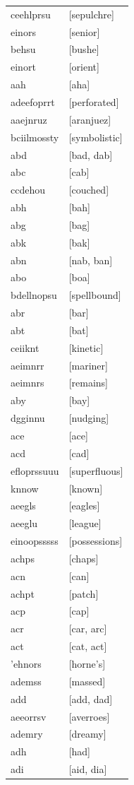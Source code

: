 \documentclass{article}
\begin{document}
\begin{tabular}{ll}
ceehlprsu & [sepulchre] \\
einors & [senior] \\
behsu & [bushe] \\
einort & [orient] \\
aah & [aha] \\
adeefoprrt & [perforated] \\
aaejnruz & [aranjuez] \\
bciilmossty & [symbolistic] \\
abd & [bad, dab] \\
abc & [cab] \\
ccdehou & [couched] \\
abh & [bah] \\
abg & [bag] \\
abk & [bak] \\
abn & [nab, ban] \\
abo & [boa] \\
bdellnopsu & [spellbound] \\
abr & [bar] \\
abt & [bat] \\
ceiiknt & [kinetic] \\
aeimnrr & [mariner] \\
aeimnrs & [remains] \\
aby & [bay] \\
dgginnu & [nudging] \\
ace & [ace] \\
acd & [cad] \\
efloprssuuu & [superfluous] \\
knnow & [known] \\
aeegls & [eagles] \\
aeeglu & [league] \\
einoopsssss & [possessions] \\
achps & [chaps] \\
acn & [can] \\
achpt & [patch] \\
acp & [cap] \\
acr & [car, arc] \\
act & [cat, act] \\
'ehnors & [horne's] \\
ademss & [massed] \\
add & [add, dad] \\
aeeorrsv & [averroes] \\
ademry & [dreamy] \\
adh & [had] \\
adi & [aid, dia] \\

\end{tabular}
\end{document}
